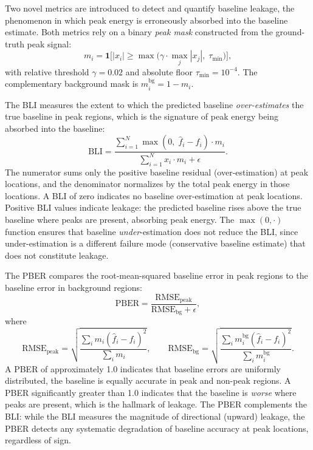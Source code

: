 Two novel metrics are introduced to detect and quantify baseline leakage, the phenomenon in which peak energy is erroneously absorbed into the baseline estimate. Both metrics rely on a binary \emph{peak mask} constructed from the ground-truth peak signal:
\begin{equation}
    m_i = \mathbf{1}\!\Big[|x_i| \geq \max\!\big(\gamma \cdot \max_j |x_j|,\; \tau_{\min}\big)\Big],
    \label{eq:eval_peak_mask}
\end{equation}
with relative threshold $\gamma = 0.02$ and absolute floor $\tau_{\min} = 10^{-4}$. The complementary background mask is $m_i^{\text{bg}} = 1 - m_i$.

 The BLI measures the extent to which the predicted baseline \emph{over-estimates} the true baseline in peak regions, which is the signature of peak energy being absorbed into the baseline:
\begin{equation}
    \text{BLI} = \frac{\sum_{i=1}^{N} \max(0,\; \hat{f}_i - f_i) \cdot m_i}{\sum_{i=1}^{N} x_i \cdot m_i + \epsilon}.
    \label{eq:bli}
\end{equation}
The numerator sums only the positive baseline residual (over-estimation) at peak locations, and the denominator normalizes by the total peak energy in those locations. A BLI of zero indicates no baseline over-estimation at peak locations. Positive BLI values indicate leakage: the predicted baseline rises above the true baseline where peaks are present, absorbing peak energy. The $\max(0, \cdot)$ function ensures that baseline \emph{under}-estimation does not reduce the BLI, since under-estimation is a different failure mode (conservative baseline estimate) that does not constitute leakage.

 The PBER compares the root-mean-squared baseline error in peak regions to the baseline error in background regions:
\begin{equation}
    \text{PBER} = \frac{\text{RMSE}_{\text{peak}}}{\text{RMSE}_{\text{bg}} + \epsilon},
\end{equation}
where
\begin{equation}
    \text{RMSE}_{\text{peak}} = \sqrt{\frac{\sum_{i} m_i (\hat{f}_i - f_i)^2}{\sum_{i} m_i}}, \qquad
    \text{RMSE}_{\text{bg}} = \sqrt{\frac{\sum_{i} m_i^{\text{bg}} (\hat{f}_i - f_i)^2}{\sum_{i} m_i^{\text{bg}}}}.
    \label{eq:pber}
\end{equation}
A PBER of approximately 1.0 indicates that baseline errors are uniformly distributed, the baseline is equally accurate in peak and non-peak regions. A PBER significantly greater than 1.0 indicates that the baseline is \emph{worse} where peaks are present, which is the hallmark of leakage. The PBER complements the BLI: while the BLI measures the magnitude of directional (upward) leakage, the PBER detects any systematic degradation of baseline accuracy at peak locations, regardless of sign.


